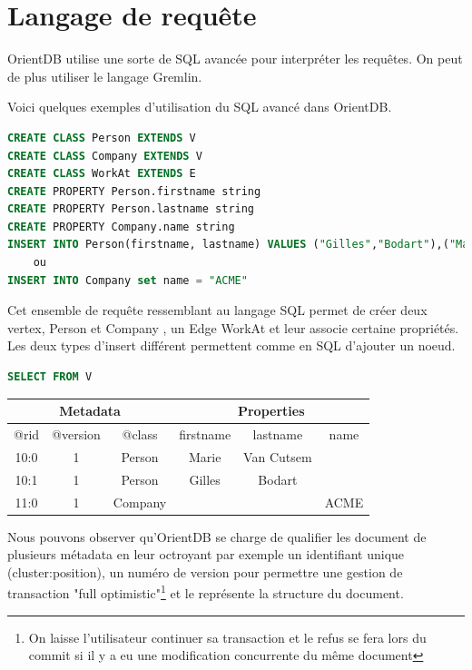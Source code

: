\documentclass[a4paper,fleqn,12pt]{report}
\begin{document}
\section{Langage de requête}

OrientDB utilise une sorte de SQL avancée pour interpréter les requêtes. On peut de plus utiliser le langage Gremlin.

Voici quelques exemples d'utilisation du SQL avancé dans OrientDB.

\begin{lstlisting}[language=SQL]
CREATE CLASS Person EXTENDS V
CREATE CLASS Company EXTENDS V
CREATE CLASS WorkAt EXTENDS E
CREATE PROPERTY Person.firstname string
CREATE PROPERTY Person.lastname string
CREATE PROPERTY Company.name string
INSERT INTO Person(firstname, lastname) VALUES ("Gilles","Bodart"),("Marie","Van Cutsem")
	ou
INSERT INTO Company set name = "ACME"

\end{lstlisting}

Cet ensemble de requête ressemblant au langage SQL permet de créer deux vertex, Person et Company , un Edge WorkAt et leur associe certaine propriétés. Les deux types d'insert différent permettent comme en SQL d'ajouter un noeud.  

\begin{lstlisting}[language=SQL]
SELECT FROM V
\end{lstlisting}
\begin{center}
	\begin{tabular}{|c|c|c|c|c|c|}
   		\hline
  		\multicolumn{3}{|c|}{Metadata} & \multicolumn{3}{c|}{Properties} \\
   		\hline
   		@rid & @version & @class & firstname & lastname & name \\
   		\hline
   		10:0 & 1 & Person & Marie & Van Cutsem &  \\
   		10:1 & 1 & Person & Gilles & Bodart &  \\
   		11:0 & 1 & Company &  &  & ACME \\
   		\hline
	\end{tabular}
\end{center}

Nous pouvons observer qu'OrientDB se charge de qualifier les document de plusieurs métadata en leur octroyant par exemple un identifiant unique (\no cluster:position), un numéro de version pour permettre une gestion de transaction "full optimistic"\footnote{On laisse l'utilisateur continuer sa transaction et le refus se fera lors du commit si il y a eu une modification concurrente du même document} et le \@class représente la structure du document.
\end{document}
